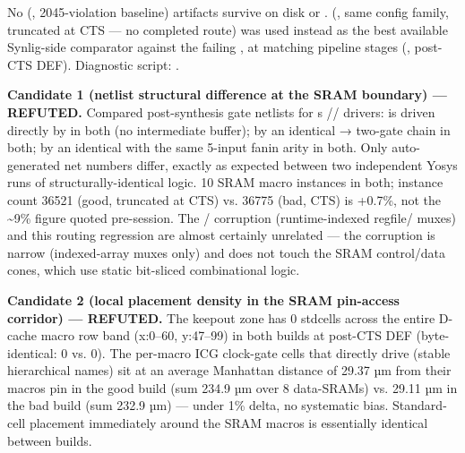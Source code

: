 \begin{record}

No  (, 2045-violation baseline)
artifacts survive on disk or .
 (, same config
family, truncated at CTS --- no completed route) was used instead as the
best available Synlig-side comparator against the failing
, at matching pipeline stages
(, post-CTS DEF). Diagnostic script:
.

\textbf{Candidate 1 (netlist structural difference at the SRAM boundary)
--- REFUTED.} Compared post-synthesis gate netlists for
\textquotesingle s
//  drivers:  is driven
directly by  in both (no intermediate
buffer);  by an identical  →
 two-gate chain in both;  by
an identical  with the same 5-input fanin
arity in both. Only auto-generated net numbers differ, exactly as
expected between two independent Yosys runs of structurally-identical
logic. 10 SRAM macro instances in both; instance count 36521 (good,
truncated at CTS) vs. 36775 (bad, CTS) is +0.7\%, not the
\textasciitilde9\% figure quoted pre-session. The /
 corruption (runtime-indexed regfile/
muxes) and this routing regression are almost certainly unrelated ---
the corruption is narrow (indexed-array muxes only) and does not touch
the SRAM control/\allowbreak{}data cones, which use static bit-sliced
combinational logic.

\textbf{Candidate 2 (local placement density in the SRAM pin-access
corridor) --- REFUTED.} The  keepout zone has 0
stdcells across the entire D-cache macro row band (x:0--60, y:47--99) in
both builds at post-CTS DEF (byte-identical: 0 vs. 0). The per-macro ICG
clock-gate cells that directly drive  (stable hierarchical
names) sit at an average Manhattan distance of 29.37 µm from their
macro\textquotesingle s  pin in the good build (sum 234.9 µm
over 8 data-SRAMs) vs. 29.11 µm in the bad build (sum 232.9 µm) ---
under 1\% delta, no systematic bias. Standard-cell placement immediately
around the SRAM macros is essentially identical between builds.


\end{record}

